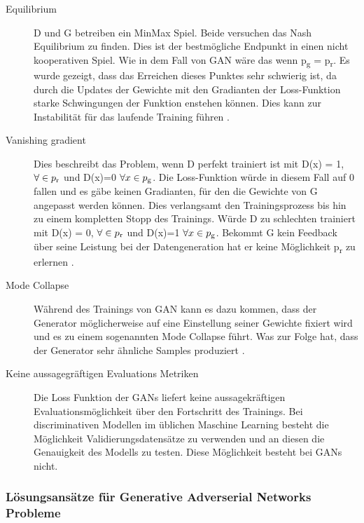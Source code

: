 \documentclass{llncs}
\begin{document}
\begin{description}	

\item[Equilibrium]
D und G betreiben ein MinMax Spiel. Beide versuchen das Nash Equilibrium zu finden. Dies ist der bestmögliche Endpunkt in einen nicht kooperativen Spiel. Wie in dem Fall von GAN wäre das wenn  p\textsubscript{g} = p\textsubscript{r}. Es wurde gezeigt, dass das Erreichen dieses Punktes sehr schwierig ist, da durch die Updates der Gewichte mit den Gradianten der Loss-Funktion starke Schwingungen der Funktion enstehen können. Dies kann zur Instabilität für das laufende Training führen \cite{improvingan}.   
\\
\item[Vanishing gradient]
Dies beschreibt das Problem, wenn D perfekt trainiert ist mit  D(x) = 1, $\forall \in p\textsubscript{r}$ und D(x)=0 $\forall x \in p \textsubscript{g}$. Die Loss-Funktion würde in diesem Fall auf 0 fallen und es gäbe keinen Gradianten, für den die Gewichte von G angepasst werden können. Dies verlangsamt den Trainingsprozess bis hin zu einem kompletten Stopp des Trainings. Würde D zu schlechten trainiert mit  D(x) = 0, $\forall \in p\textsubscript{r}$ und D(x)=1 $\forall x \in p \textsubscript{g}$. Bekommt G kein Feedback über seine Leistung bei der Datengeneration hat er keine Möglichkeit p\textsubscript{r} zu erlernen \cite{improvingan}.
\\
\item[Mode Collapse]
Während des Trainings von GAN kann es dazu kommen, dass der Generator möglicherweise auf eine Einstellung seiner Gewichte fixiert wird und es zu einem sogenannten Mode Collapse führt. Was zur Folge hat, dass der Generator sehr ähnliche Samples produziert \cite{wasserstein}.
\\
\item[Keine aussagegräftigen Evaluations Metriken]
Die Loss Funktion der GANs liefert keine aussagekräftigen Evaluationsmöglichkeit über den Fortschritt des Trainings. Bei  discriminativen Modellen im üblichen Maschine Learning besteht die Möglichkeit Validierungsdatensätze zu verwenden und an diesen die Genauigkeit des Modells zu testen. Diese Möglichkeit besteht bei GANs nicht\cite{metrics}.
\end{description}
\newpage

\subsubsection{Lösungsansätze für Generative Adverserial Networks Probleme}
\end{document}
